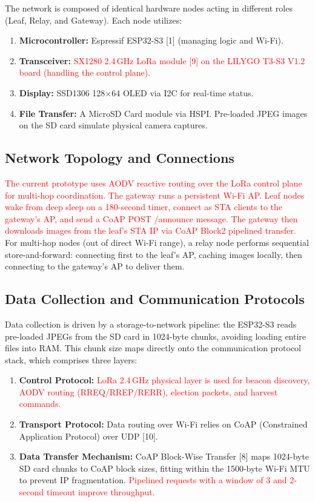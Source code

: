 \documentclass[12pt,a4paper]{article}
\DeclareRobustCommand{\changed}[1]{\textcolor{red}{#1}}
\begin{document}
The network is composed of identical hardware nodes acting in different roles (Leaf, Relay, and Gateway). Each node utilizes:

\begin{enumerate}
    \item \textbf{Microcontroller:} Espressif ESP32-S3 [1] (managing logic and Wi-Fi).
    \item \textbf{Transceiver:} \changed{SX1280 2.4\,GHz LoRa module [9] on the LILYGO T3-S3 V1.2 board (handling the control plane).}
    \item \textbf{Display:} SSD1306 128$\times$64 OLED via I2C for real-time status.
    \item \textbf{File Transfer:} A MicroSD Card module via HSPI. Pre-loaded JPEG images on the SD card simulate physical camera captures.
\end{enumerate}

\subsection{Network Topology and Connections}

\changed{The current prototype uses AODV reactive routing over the LoRa control plane for multi-hop coordination. The gateway runs a persistent Wi-Fi AP. Leaf nodes wake from deep sleep on a 180-second timer, connect as STA clients to the gateway's AP, and send a CoAP POST /announce message. The gateway then downloads images from the leaf's STA IP via CoAP Block2 pipelined transfer.} For multi-hop nodes (out of direct Wi-Fi range), a relay node performs sequential store-and-forward: connecting first to the leaf's AP, caching images locally, then connecting to the gateway's AP to deliver them.

\subsection{Data Collection and Communication Protocols}

Data collection is driven by a storage-to-network pipeline: the ESP32-S3 reads pre-loaded JPEGs from the SD card in 1024-byte chunks, avoiding loading entire files into RAM. This chunk size maps directly onto the communication protocol stack, which comprises three layers:

\begin{enumerate}
    \item \textbf{Control Protocol:} \changed{LoRa 2.4\,GHz physical layer is used for beacon discovery, AODV routing (RREQ/RREP/RERR), election packets, and harvest commands.}
    \item \textbf{Transport Protocol:} Data routing over Wi-Fi relies on CoAP (Constrained Application Protocol) over UDP [10].
    \item \textbf{Data Transfer Mechanism:} CoAP Block-Wise Transfer [8] maps 1024-byte SD card chunks to CoAP block sizes, fitting within the 1500-byte Wi-Fi MTU to prevent IP fragmentation. \changed{Pipelined requests with a window of 3 and 2-second timeout improve throughput.}
\end{enumerate}
\end{document}
